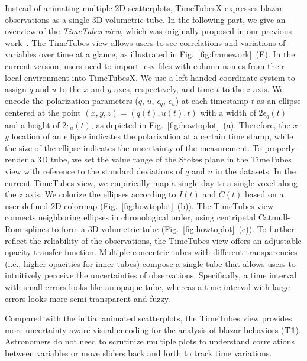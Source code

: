 Instead of animating multiple 2D scatterplots,
TimeTubesX expresses blazar observations as a single 3D volumetric tube. 
In the following part, we give an overview of the \emph{TimeTubes view}, which was originally proposed in our previous work~\cite{Fujishiro2018}.
The TimeTubes view allows users to see correlations and variations of variables over time at a glance, as illustrated in Fig.~\ref{fig:framework}~(E).
In the current version, users need to import .csv files with column names from their local environment into TimeTubesX.
We use a left-handed coordinate system to assign $q$ and $u$ to the $x$ and $y$ axes, respectively, and time $t$ to the $z$ axis.
We encode the polarization parameters ($q$, $u$, $\epsilon_q$, $\epsilon_u$) at each timestamp $t$ as an ellipse centered at the point $(x, y, z) = (q(t), u(t), t)$ with a width of $2\epsilon_q(t)$ and a height of $2\epsilon_u(t)$, as depicted in Fig.~\ref{fig:howtoplot}~(a). 
Therefore, the $x$--$y$ location of an ellipse indicates the polarization at a certain time stamp, while the size of the ellipse indicates the uncertainty of the measurement.
To properly render a 3D tube, we set the value range of the Stokes plane in the TimeTubes view with reference to the standard deviations of $q$ and $u$ in the datasets. 
In the current TimeTubes view, we empirically map a single day to a single voxel along the $z$ axis.
We colorize the ellipses according to $I(t)$ and $C(t)$ based on a user-defined 2D colormap (Fig.~\ref{fig:howtoplot}~(b)). 
The TimeTubes view connects neighboring ellipses in chronological order, using centripetal Catmull-Rom splines to form a 3D volumetric tube (Fig.~\ref{fig:howtoplot}~(c)). 
To further reflect the reliability of the observations, the TimeTubes view offers an adjustable opacity transfer function.
Multiple concentric tubes with different transparencies (i.e., higher opacities for inner tubes) compose a single tube that allows users to intuitively perceive the uncertainties of observations.
Specifically, a time interval with small errors looks like an opaque tube, whereas a time interval with large errors looks more semi-transparent and fuzzy.

Compared with the initial animated scatterplots,
the TimeTubes view provides more uncertainty-aware visual encoding for the analysis of blazar behaviors (\textbf{T1}).
Astronomers do not need to scrutinize multiple plots to understand correlations between variables
or move sliders back and forth 
to track time variations.


